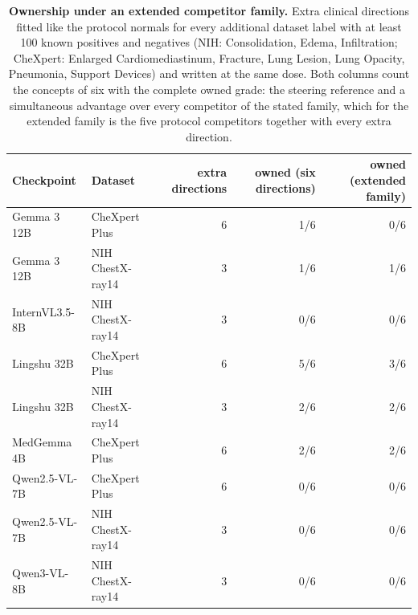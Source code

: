 \begin{table}[h]
\centering
\scriptsize
\setlength{\tabcolsep}{4pt}
\caption{\textbf{Ownership under an extended competitor family.} Extra clinical directions fitted like the protocol normals for every additional dataset label with at least 100 known positives and negatives (NIH: Consolidation, Edema, Infiltration; CheXpert: Enlarged Cardiomediastinum, Fracture, Lung Lesion, Lung Opacity, Pneumonia, Support Devices) and written at the same dose. Both columns count the concepts of six with the complete owned grade: the steering reference and a simultaneous advantage over every competitor of the stated family, which for the extended family is the five protocol competitors together with every extra direction.}
\label{tab:cf-extcomp}
\begin{tabular}{llrrr}
\toprule
Checkpoint & Dataset & extra directions & owned (six directions) & owned (extended family) \\
\midrule
Gemma 3 12B & CheXpert Plus & 6 & 1/6 & 0/6 \\
Gemma 3 12B & NIH ChestX-ray14 & 3 & 1/6 & 1/6 \\
InternVL3.5-8B & NIH ChestX-ray14 & 3 & 0/6 & 0/6 \\
Lingshu 32B & CheXpert Plus & 6 & 5/6 & 3/6 \\
Lingshu 32B & NIH ChestX-ray14 & 3 & 2/6 & 2/6 \\
MedGemma 4B & CheXpert Plus & 6 & 2/6 & 2/6 \\
Qwen2.5-VL-7B & CheXpert Plus & 6 & 0/6 & 0/6 \\
Qwen2.5-VL-7B & NIH ChestX-ray14 & 3 & 0/6 & 0/6 \\
Qwen3-VL-8B & NIH ChestX-ray14 & 3 & 0/6 & 0/6 \\
\bottomrule
\end{tabular}
\end{table}
